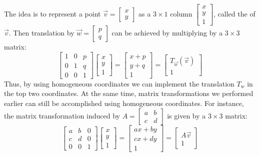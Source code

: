 \documentclass{ximera}
\begin{document}
The idea is to represent a point $\vec{v} = \left[
\begin{array}{r}
x\\
y
\end{array}
\right]$
 as a $3 \times 1$ column $\left[
 \begin{array}{r}
 x\\
 y\\
 1
 \end{array}
 \right]$, called the  of $\vec{v}$. Then translation by $\vec{w} = \left[
 \begin{array}{r}
 p\\
 q
 \end{array}
 \right]$ can be achieved by multiplying by a $3 \times 3$ matrix:
\begin{equation*}
\left[
\begin{array}{rrr}
1 & 0 & p\\
0 & 1 & q\\
0 & 0 & 1
\end{array}
\right] \left[
\begin{array}{r}
x\\
y\\
1
\end{array}
\right]
=
\left[
\begin{array}{c}
x + p\\
y + q\\
1
\end{array}
\right]
=
\left[
\begin{array}{c}
T_{\vec{w}}(\vec{v})\\
1
\end{array}
\right]
\end{equation*}
Thus, by using homogeneous coordinates we can implement the translation $T_{w}$ in the top two coordinates. At the same time, matrix transformations we performed earlier can still be accomplished using homogeneous coordinates.  For instance, the matrix transformation induced by $A = \left[
\begin{array}{rr}
a & b\\
c & d
\end{array}
\right]$ is given by a $3 \times 3$ matrix:
\begin{equation*}
\left[
\begin{array}{rrr}
a & b & 0\\
c & d & 0\\
0 & 0 & 1
\end{array}
\right] \left[
\begin{array}{r}
x\\
y\\
1
\end{array}
\right]
=
\left[
\begin{array}{c}
ax + by\\
cx + dy\\
1
\end{array}
\right]
=
\left[
\begin{array}{c}
A\vec{v}\\
1
\end{array}
\right]
\end{equation*}
\end{document}
